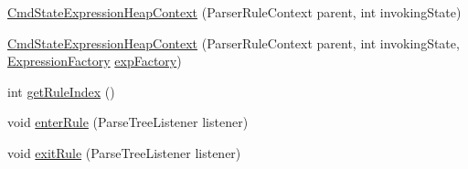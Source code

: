 \begin{DoxyCompactItemize}
\hyperlink{classgov_1_1nasa_1_1jpf_1_1inspector_1_1server_1_1expression_1_1parser_1_1_expression_grammar_pa4cb3092c60a124c5db4482cce4b4fe10_a8aad35110cc005ba1c792e332c34cafc}{Cmd\+State\+Expression\+Heap\+Context} (Parser\+Rule\+Context parent, int invoking\+State)
\item 
\hyperlink{classgov_1_1nasa_1_1jpf_1_1inspector_1_1server_1_1expression_1_1parser_1_1_expression_grammar_pa4cb3092c60a124c5db4482cce4b4fe10_a1fb5bc1a3451ded19b1d045c27ac574a}{Cmd\+State\+Expression\+Heap\+Context} (Parser\+Rule\+Context parent, int invoking\+State, \hyperlink{classgov_1_1nasa_1_1jpf_1_1inspector_1_1server_1_1expression_1_1_expression_factory}{Expression\+Factory} \hyperlink{classgov_1_1nasa_1_1jpf_1_1inspector_1_1server_1_1expression_1_1parser_1_1_expression_grammar_pa4cb3092c60a124c5db4482cce4b4fe10_ace568ace29cc82f1d8a95525d119c889}{exp\+Factory})
\item 
int \hyperlink{classgov_1_1nasa_1_1jpf_1_1inspector_1_1server_1_1expression_1_1parser_1_1_expression_grammar_pa4cb3092c60a124c5db4482cce4b4fe10_a4f9a1e3f66765624e0f5f954b6d705a8}{get\+Rule\+Index} ()
\item 
void \hyperlink{classgov_1_1nasa_1_1jpf_1_1inspector_1_1server_1_1expression_1_1parser_1_1_expression_grammar_pa4cb3092c60a124c5db4482cce4b4fe10_a7522d1fbe79de955e713945e01c6d0a1}{enter\+Rule} (Parse\+Tree\+Listener listener)
\item 
void \hyperlink{classgov_1_1nasa_1_1jpf_1_1inspector_1_1server_1_1expression_1_1parser_1_1_expression_grammar_pa4cb3092c60a124c5db4482cce4b4fe10_aa4bb56872a2b873e5edbce0a36a96820}{exit\+Rule} (Parse\+Tree\+Listener listener)
\end{DoxyCompactItemize}
